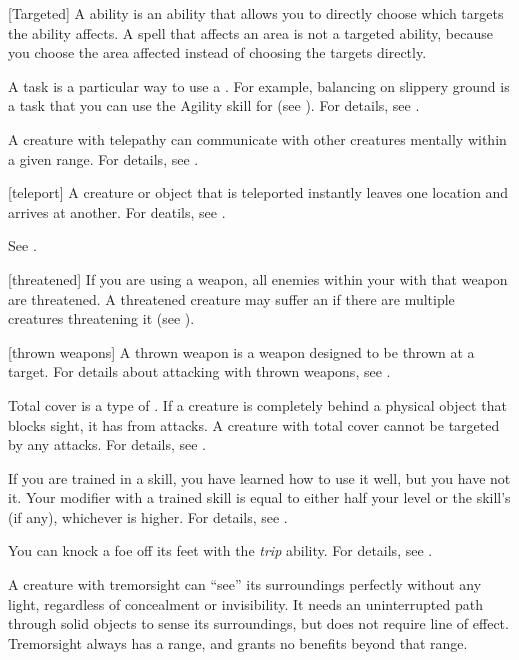 [Targeted] A  ability is an ability that allows you to directly choose which targets the ability affects.
A spell that affects an area is not a targeted ability, because you choose the area affected instead of choosing the targets directly.

 A task is a particular way to use a .
For example, balancing on slippery ground is a task that you can use the Agility skill for (see ).
For details, see .

 A creature with telepathy can communicate with other creatures mentally within a given range.
For details, see .

[teleport] A creature or object that is teleported instantly leaves one location and arrives at another.
For deatils, see .

 See .

[threatened] If you are using a  weapon, all enemies within your  with that weapon are threatened.
A threatened creature may suffer an  if there are multiple creatures threatening it (see ).

[thrown weapons] A thrown weapon is a weapon designed to be thrown at a target.
For details about attacking with thrown weapons, see .

 Total cover is a type of .
If a creature is completely behind a physical object that blocks sight, it has  from attacks.
A creature with total cover cannot be targeted by any attacks.
For details, see .

 If you are trained in a skill, you have learned how to use it well, but you have not  it.
Your modifier with a trained skill is equal to either half your level  or the skill's  (if any), whichever is higher.
For details, see .

 You can knock a foe off its feet with the \textit{trip} ability.
For details, see .

 A creature with tremorsight can ``see'' its surroundings perfectly without any light, regardless of concealment or invisibility.
It needs an uninterrupted path through solid objects to sense its surroundings, but does not require line of effect.
Tremorsight always has a range, and grants no benefits beyond that range.


